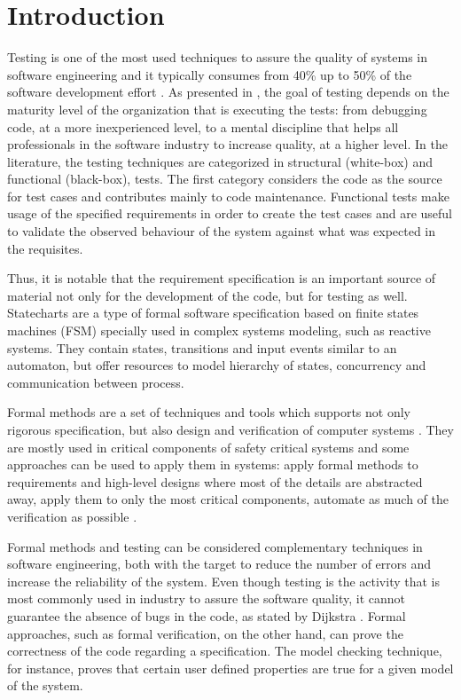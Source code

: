 \chapter{Introduction}
\label{cap:introducao}

Testing is one of the most used techniques to assure the quality of systems in software engineering and it typically consumes from 40\% up to 50\% of the software development effort \cite{Luo}. As presented in \cite{Ammann:08}, the goal of testing depends on the maturity level of the organization that is executing the tests: from debugging code, at a more inexperienced level, to a mental discipline that helps all professionals in the software industry to increase quality, at a higher level. In the literature, the testing techniques are categorized in structural (white-box) and functional (black-box), tests. The first category considers the code as the source for test cases and contributes mainly to code maintenance. Functional tests make usage of the specified requirements in order to create the test cases and are useful to validate the observed behaviour of the system against what was expected in the requisites.

Thus, it is notable that the requirement specification is an important source of material not only for the development of the code, but for testing as well. Statecharts are a type of formal software specification based on finite states machines (FSM) specially used in complex systems modeling, such as reactive systems\cite{harel87:semantics_statecharts}. They contain states, transitions and input events similar to an automaton, but offer resources to model hierarchy of states, concurrency and communication between process.


Formal methods are a set of techniques and tools which supports not only rigorous specification, but also design and verification of computer systems \cite{FMEurope}. They are mostly used in critical components of safety critical systems and some approaches can be used to apply them in systems: apply formal methods to requirements and high-level designs where most of the details are abstracted away, apply them to only the most critical components, automate as much of the verification as possible \cite{NASAlangley}. 


Formal methods and testing can be considered complementary techniques in software engineering, both with the target to reduce the number of errors and increase the reliability of the system\cite{fortest}. Even though testing is the activity that is most commonly used in industry to assure the software quality, it cannot guarantee the absence of bugs in the code, as stated by Dijkstra \cite{dijkstra}. Formal approaches, such as formal verification, on the other hand, can prove the correctness of the code regarding a specification. The model checking technique, for instance, proves that certain user defined properties are true for a given model of the system.


